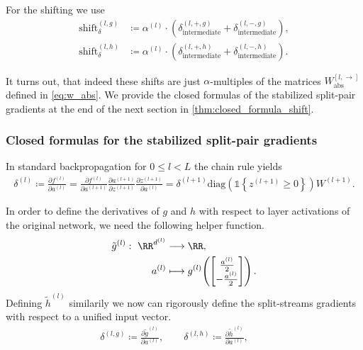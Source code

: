 For the shifting we use
\begin{align}
    \text{shift}_\delta^{(l, g)} & \coloneqq \alpha^{(l)} \cdot \left( \delta_{\text{intermediate}}^{(l, +, g)} + \delta_{\text{intermediate}}^{(l, -, g)} \right), \\
    \text{shift}_\delta^{(l, h)} & \coloneqq \alpha^{(l)} \cdot \left( \delta_{\text{intermediate}}^{(l, +, h)} + \delta_{\text{intermediate}}^{(l, -, h)} \right).
\end{align}

It turns out, that indeed these shifts are just $\alpha$-multiples of the matrices $W_{\text{abs}}^{[l, \rightarrow]}$ defined in \cref{eq:w_abs}.
We provide the closed formulas of the stabilized split-pair gradients at the end of the next section in \cref{thm:closed_formula_shift}.

\subsubsection{Closed formulas for the stabilized split-pair gradients}

In standard backpropagation for $0 \leq l < L$ the chain rule yields
\begin{align}
    \delta^{(l)}
        \coloneqq \frac{\partial f^{(l)}}{\partial a^{(l)}}
        = \frac{\partial f^{(l)}}{\partial a^{(l+1)}} \frac{\partial a^{(l+1)}}{\partial z^{(l+1)}} \frac{\partial z^{(l+1)}}{\partial a^{(l)}}
        = \delta^{(l+1)} \text{diag} \left( \mathbb{1}\left\{ z^{(l+1)} \geq 0 \right\} \right) W^{(l+1)}. \label{eq:std_bckprop}
\end{align}

In order to define the derivatives of $g$ and $h$ with respect to layer activations of the original network, we need the following helper function.
\begin{align}
    \tilde{g}^{(l)} :\ \RR^{d^{(l)}} &\longrightarrow \RR, \\
     a^{(l)} &\longmapsto g^{(l)}\!\left( \begin{bmatrix} \frac{a^{(l)}}{2} \\ -\frac{a^{(l)}}{2} \end{bmatrix} \right).
\end{align}
Defining $\tilde{h}^{(l)}$ similarily we now can rigorously define the split-streams gradients with respect to a unified input vector.
\begin{align}
    \delta^{(l, g)} \coloneqq \frac{\partial \tilde{g}^{(l)}}{\partial a^{(l)}}, \qquad
    \delta^{(l, h)} \coloneqq \frac{\partial \tilde{h}^{(l)}}{\partial a^{(l)}}, \qquad
\end{align}

